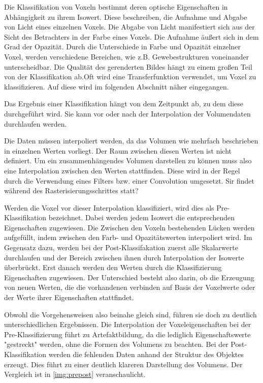 Die Klassifikation von Voxeln bestimmt deren optische Eigenschaften in Abhängigkeit zu ihrem Isowert. Diese beschreiben, die Aufnahme und Abgabe von Licht eines einzelnen Voxels. Die Abgabe von Licht manifestiert sich aus der Sicht des Betrachters in der Farbe eines Voxels. Die Aufnahme äußert sich in dem Grad der Opazität. Durch die Unterschiede in Farbe und Opazität einzelner Voxel, werden verschiedene Bereichen, wie z.B. Gewebestrukturen voneinander unterscheidbar. Die Qualität des gerenderten Bildes hängt zu einem großen Teil von der Klassifikation ab.Oft wird eine Transferfunktion verwendet, um Voxel zu klassifizieren. Auf diese wird im folgenden Abschnitt näher eingegangen. 

Das Ergebnis einer Klassifikation hängt von dem Zeitpunkt ab, zu dem diese durchgeführt wird. Sie kann vor oder nach der Interpolation der Volumendaten durchlaufen werden.

Die Daten müssen interpoliert werden, da das Volumen wie mehrfach beschrieben in einzelnen Werten vorliegt. Der Raum zwischen diesen Werten ist nicht definiert. Um ein zusammenhängendes Volumen darstellen zu können muss also eine Interpolation zwischen den Werten stattfinden. Diese wird in der Regel durch die Verwendung eines Filters bzw. einer Convolution umgesetzt. Sir findet während des Rasterisierungsschrittes statt?

Werden die Voxel vor dieser Interpolation klassifiziert, wird dies als Pre-Klassifikation bezeichnet. Dabei werden jedem Isowert die entsprechenden Eigenschaften zugewiesen. Die Zwischen den Voxeln bestehenden Lücken werden aufgefüllt, indem zwischen den Farb- und Opazitätswerten interpoliert wird. 
Im Gegensatz dazu, werden bei der Post-Klassifakation zuerst alle Skalarwerte durchlaufen und der Bereich zwischen ihnen durch Interpolation der Isowerte überbrückt. Erst danach werden den Werten durch die Klassifizierung Eigenschaften zugewiesen. Der Unterschied besteht also darin, ob die Erzeugung von neuen Werten, die die vorhandenen verbinden auf Basis der Voxelwerte oder der Werte ihrer Eigenschaften stattfindet. \cite{Hadwiger06}



Obwohl die Vorgehensweisen also beinahe gleich sind, führen sie doch zu deutlich unterschiedlichen Ergebnissen. Die Interpolation der Voxeleigenschaften bei der Pre-Klassifizierung führt zu Artefaktbildung, da die lediglich Eigenschaftswerte "gestreckt" werden, ohne die Formen des Volumens zu beachten. Bei der Post-Klassifikation werden die fehlenden Daten anhand der Struktur des Objektes erzeugt. Dies führt zu einer deutlich klareren Darstellung des Volumens. Der Vergleich ist in \ref{img:prepost} veranschaulicht.

